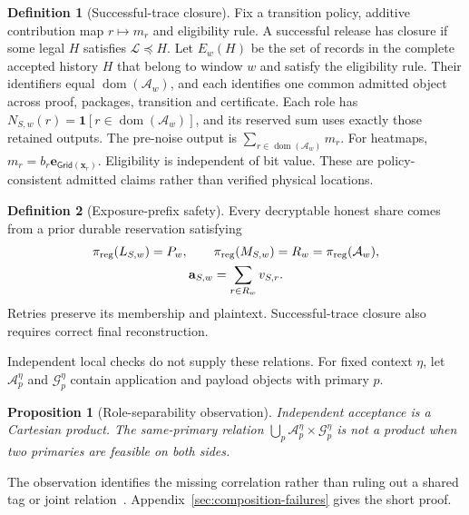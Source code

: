 \documentclass[conference,compsoc]{IEEEtran}
\theoremstyle{definition}
\newtheorem{definition}{Definition}[section]
\newtheorem{definition}{Definition}
\numberwithin{equation}{section}
\numberwithin{table}{section}
\numberwithin{figure}{section}
\theoremstyle{plain}
\newtheorem{proposition}{Proposition}[section]
\newtheorem{proposition}{Proposition}
\begin{document}
\begin{definition}[Successful-trace closure]
\label{def:trace-closure}
Fix a transition policy, additive contribution map \(r\mapsto m_r\) and
eligibility rule. A successful release has closure if some legal \(H\)
satisfies \(\mathcal L\preceq H\). Let \(E_w(H)\) be the set of records in
the complete accepted history \(H\) that belong to window \(w\) and satisfy
the eligibility rule. Their identifiers equal \(\operatorname{dom}(\mathcal A_w)\),
and each identifies one common admitted object across proof, packages,
transition and certificate. Each role has
\(N_{S,w}(r)=\mathbf1[r\in\operatorname{dom}(\mathcal A_w)]\), and its reserved sum uses exactly
those retained outputs. The pre-noise output is
\(\sum_{r\in\operatorname{dom}(\mathcal A_w)}m_r\). For heatmaps,
\(m_r=b_r\mathbf e_{\mathsf{Grid}(\mathbf x_r)}\). Eligibility is independent
of bit value. These are policy-consistent admitted claims rather than verified
physical locations.
\end{definition}

\begin{definition}[Exposure-prefix safety]
\label{def:exposure-prefix}
Every decryptable honest share comes from a prior durable reservation
satisfying
\begin{equation}
 \begin{gathered}
 \pi_{\rm reg}(L_{S,w})=P_w,\qquad
 \pi_{\rm reg}(M_{S,w})=R_w=\pi_{\rm reg}(\mathcal A_w),\\
 \mathbf a_{S,w}=\sum_{r\in R_w}v_{S,r}.
 \end{gathered}
 \label{eq:export-safety}
\end{equation}
Retries preserve its membership and plaintext. Successful-trace closure also
requires correct final reconstruction.
\end{definition}

Independent local checks do not supply these relations. For fixed context
\(\eta\), let \(\mathcal A_p^\eta\) and \(\mathcal G_p^\eta\) contain
application and payload objects with primary \(p\).
\begin{proposition}[Role-separability observation]
\label{prop:rectangularity-main}
Independent acceptance is a Cartesian product. The same-primary relation
\(\bigcup_p\mathcal A_p^\eta\times\mathcal G_p^\eta\) is not a product
when two primaries are feasible on both sides.
\end{proposition}
The observation identifies the missing correlation rather than ruling out a
shared tag or joint relation~\cite{Kushilevitz1997Communication}.
Appendix~\ref{sec:composition-failures} gives the short proof.
\end{document}
